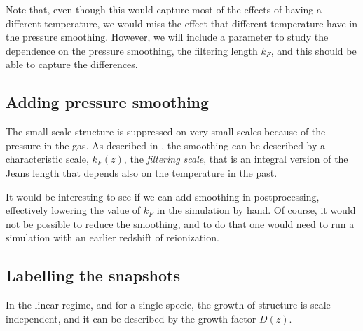 Note that, even though this would capture most of the effects of having a 
different temperature, we would miss the effect that different temperature
have in the pressure smoothing.
However, we will include a parameter to study the dependence on the pressure
smoothing, the filtering length $k_F$, and this should be able to capture
the differences.


\subsection{Adding pressure smoothing}

The small scale structure is suppressed on very small scales because of the
pressure in the gas. 
As described in \cite{Hui1997,Gnedin1998}, the smoothing can be described
by a characteristic scale, $k_F(z)$, the \textit{filtering scale}, that is
an integral version of the Jeans length that depends also on the temperature
in the past.

It would be interesting to see if we can add smoothing in postprocessing, 
effectively lowering the value of $k_F$ in the simulation by hand. 
Of course, it would not be possible to reduce the smoothing, and to do that 
one would need to run a simulation with an earlier redshift of reionization.



\subsection{Labelling the snapshots}

In the linear regime, and for a single specie, the growth of structure is 
scale independent, and it can be described by the growth factor $D(z)$.

